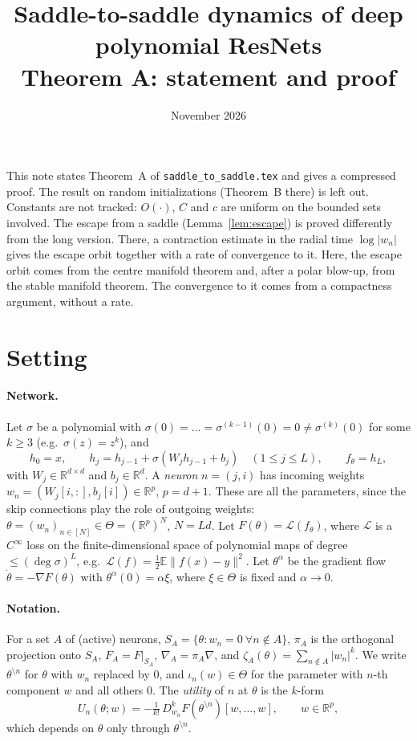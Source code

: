 \documentclass[11pt]{article}
\title{Saddle-to-saddle dynamics of deep polynomial ResNets\\[4pt]\large Theorem A: statement and proof}
\author{}
\date{November 2026}
\theoremstyle{definition}
\theoremstyle{remark}
\newcommand{\R}{\mathbb{R}}
\newcommand{\E}{\mathbb{E}}
\newcommand{\cL}{\mathcal{L}}
\newcommand{\sm}{\setminus}
\begin{document}
\maketitle

\noindent
This note states Theorem~A of \texttt{saddle\_to\_saddle.tex} and gives a compressed proof. The result on random initializations (Theorem~B there) is left out. Constants are not tracked: $O(\cdot)$, $C$ and $c$ are uniform on the bounded sets involved. The escape from a saddle (Lemma~\ref{lem:escape}) is proved differently from the long version. There, a contraction estimate in the radial time $\log|w_n|$ gives the escape orbit together with a rate of convergence to it. Here, the escape orbit comes from the centre manifold theorem and, after a polar blow-up, from the stable manifold theorem. The convergence to it comes from a compactness argument, without a rate.

\section{Setting}

\paragraph{Network.} Let $\sigma$ be a polynomial with $\sigma(0)=\dots=\sigma^{(k-1)}(0)=0\ne\sigma^{(k)}(0)$ for some $k\ge3$ (e.g.\ $\sigma(z)=z^k$), and
\[
h_0=x,\qquad h_j=h_{j-1}+\sigma(W_jh_{j-1}+b_j)\quad(1\le j\le L),\qquad f_\theta=h_L,
\]
with $W_j\in\R^{d\times d}$ and $b_j\in\R^d$. A \emph{neuron} $n=(j,i)$ has incoming weights $w_n=(W_j[i,:],b_j[i])\in\R^p$, $p=d+1$. These are all the parameters, since the skip connections play the role of outgoing weights: $\theta=(w_n)_{n\in[N]}\in\Theta=(\R^p)^N$, $N=Ld$. Let $F(\theta)=\cL(f_\theta)$, where $\cL$ is a $C^\infty$ loss on the finite-dimensional space of polynomial maps of degree $\le(\deg\sigma)^L$, e.g.\ $\cL(f)=\frac12\E\|f(x)-y\|^2$. Let $\theta^\alpha$ be the gradient flow $\dot\theta=-\nabla F(\theta)$ with $\theta^\alpha(0)=\alpha\xi$, where $\xi\in\Theta$ is fixed and $\alpha\to0$.

\paragraph{Notation.} For a set $A$ of (active) neurons, $S_A=\{\theta:w_n=0\ \forall n\notin A\}$, $\pi_A$ is the orthogonal projection onto $S_A$, $F_A=F|_{S_A}$, $\nabla_A=\pi_A\nabla$, and $\zeta_A(\theta)=\sum_{n\notin A}|w_n|^k$. We write $\theta^{\sm n}$ for $\theta$ with $w_n$ replaced by $0$, and $\iota_n(w)\in\Theta$ for the parameter with $n$-th component $w$ and all others $0$. The \emph{utility} of $n$ at $\theta$ is the $k$-form
\[
U_n(\theta;w)=-\tfrac1{k!}\,D^k_{w_n}F(\theta^{\sm n})[w,\dots,w],\qquad w\in\R^p,
\]
which depends on $\theta$ only through $\theta^{\sm n}$.
\end{document}
